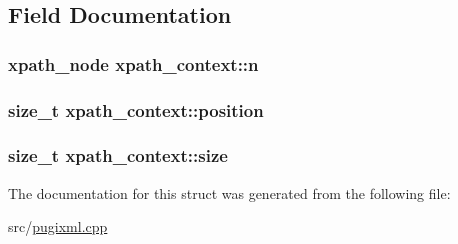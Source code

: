 \subsection{Field Documentation}
\hypertarget{structxpath__context_ace8fbb8121820bc5054605c166101273}{
\subsubsection[{n}]{\setlength{\rightskip}{0pt plus 5cm}xpath\_\-node {\bf xpath\_\-context::n}}}
\label{structxpath__context_ace8fbb8121820bc5054605c166101273}
\hypertarget{structxpath__context_add1fc9bd16b21d3a8d7a4bd63c60af07}{
\subsubsection[{position}]{\setlength{\rightskip}{0pt plus 5cm}size\_\-t {\bf xpath\_\-context::position}}}
\label{structxpath__context_add1fc9bd16b21d3a8d7a4bd63c60af07}
\hypertarget{structxpath__context_a976ffb0eff84a7779c97e589c1785d1c}{
\subsubsection[{size}]{\setlength{\rightskip}{0pt plus 5cm}size\_\-t {\bf xpath\_\-context::size}}}
\label{structxpath__context_a976ffb0eff84a7779c97e589c1785d1c}


The documentation for this struct was generated from the following file:\begin{DoxyCompactItemize}
\item 
src/\hyperlink{pugixml_8cpp}{pugixml.cpp}\end{DoxyCompactItemize}
